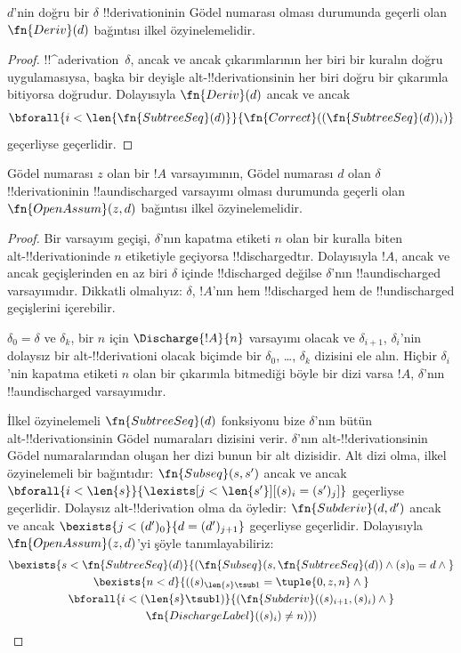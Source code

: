 \documentclass[../../../include/open-logic-section]{subfiles}
\begin{document}
\begin{prop}
  $d$'nin doğru bir $\delta$ !!{derivation}{}inin Gödel numarası olması
  durumunda geçerli olan $\fn{Deriv}(d)$ bağıntısı ilkel özyinelemelidir.
\end{prop}

\begin{proof}
  !!^a{derivation}~$\delta$, ancak ve ancak çıkarımlarının her biri bir
  kuralın doğru uygulamasıysa, başka bir deyişle alt-!!{derivation}s{}inin her
  biri doğru bir çıkarımla bitiyorsa doğrudur. Dolayısıyla $\fn{Deriv}(d)$
  ancak ve ancak
  \[
  \bforall{i<\len{\fn{SubtreeSeq}(d)}}{\fn{Correct}((\fn{SubtreeSeq}(d))_i)}
  \]
  geçerliyse geçerlidir.
\end{proof}

\begin{prop}
   Gödel numarası $z$ olan bir $!A$ varsayımının,
  Gödel numarası $d$ olan $\delta$ !!{derivation}{}inin !!a{undischarged}
  varsayımı olması durumunda geçerli olan $\fn{OpenAssum}(z, d)$ bağıntısı
  ilkel özyinelemelidir.
\end{prop}

\begin{proof}
  Bir varsayım geçişi, $\delta$'nın kapatma etiketi $n$ olan bir kuralla
  biten alt-!!{derivation}{}inde $n$ etiketiyle geçiyorsa !!{discharged}{}tır.
  Dolayısıyla $!A$, ancak ve ancak geçişlerinden en az biri $\delta$ içinde
  !!{discharged} değilse $\delta$'nın !!a{undischarged} varsayımıdır. Dikkatli
  olmalıyız: $\delta$, $!A$'nın hem !!{discharged} hem de !!{undischarged}
  geçişlerini içerebilir.

  $\delta_0 = \delta$ ve $\delta_k$, bir $n$ için
  $\Discharge{!A}{n}$ varsayımı olacak ve $\delta_{i+1}$,
  $\delta_i$'nin dolaysız bir alt-!!{derivation}{}i olacak biçimde bir
  $\delta_0$, \dots, $\delta_k$ dizisini ele alın. Hiçbir $\delta_i$'nin
  kapatma etiketi $n$ olan bir çıkarımla bitmediği böyle bir dizi varsa
  $!A$, $\delta$'nın !!a{undischarged} varsayımıdır.

  İlkel özyinelemeli $\fn{SubtreeSeq}(d)$ fonksiyonu bize $\delta$'nın bütün
  alt-!!{derivation}s{}inin Gödel numaraları dizisini verir. $\delta$'nın
  alt-!!{derivation}s{}inin Gödel numaralarından oluşan her dizi bunun bir alt
  dizisidir. Alt dizi olma, ilkel özyinelemeli bir bağıntıdır:
  $\fn{Subseq}(s, s')$ ancak ve ancak
  $\bforall{i<\len{s}}{\lexists[j<\len{s'}][(s)_i = (s')_j]}$ geçerliyse
  geçerlidir. Dolaysız alt-!!{derivation} olma da öyledir:
  $\fn{Subderiv}(d, d')$ ancak ve ancak
  $\bexists{j<(d')_0}{d = (d')_{j+1}}$ geçerliyse geçerlidir. Dolayısıyla
  $\fn{OpenAssum}(z, d)$'yi şöyle tanımlayabiliriz:
  \begin{multline*}
    \bexists{s<\fn{SubtreeSeq}(d)}{(\fn{Subseq}(s, \fn{SubtreeSeq}(d))
      \land (s)_0 = d \land {}} \\
    \bexists{n<d}{((s)_{\len{s} \tsub 1} = \tuple{0, z, n} \land {}}\\
      \bforall{i<(\len{s} \tsub 1)}{(\fn{Subderiv}((s)_{i+1}, (s)_i) \land {}}\\
      \fn{DischargeLabel}((s)_i) \neq n)))
  \end{multline*}
\end{proof}
\end{document}
